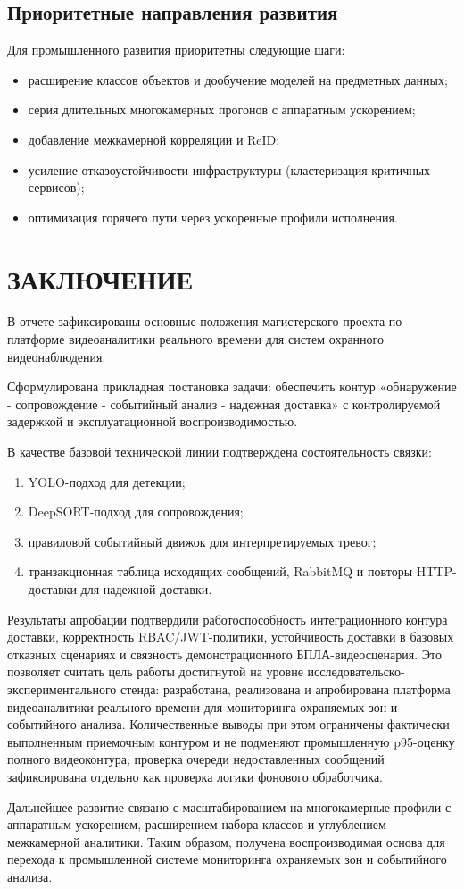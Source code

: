 \section{Приоритетные направления развития}

Для промышленного развития приоритетны следующие шаги:
\begin{itemize}
    \item расширение классов объектов и дообучение моделей на предметных данных;
    \item серия длительных многокамерных прогонов с аппаратным ускорением;
    \item добавление межкамерной корреляции и ReID;
    \item усиление отказоустойчивости инфраструктуры (кластеризация критичных сервисов);
    \item оптимизация горячего пути через ускоренные профили исполнения.
\end{itemize}

\chapter*{ЗАКЛЮЧЕНИЕ}

В отчете зафиксированы основные положения магистерского проекта по платформе видеоаналитики реального времени для систем охранного видеонаблюдения.

Сформулирована прикладная постановка задачи: обеспечить контур «обнаружение - сопровождение - событийный анализ - надежная доставка» с контролируемой задержкой и эксплуатационной воспроизводимостью.

В качестве базовой технической линии подтверждена состоятельность связки:
\begin{enumerate}
    \item YOLO-подход для детекции;
    \item DeepSORT-подход для сопровождения;
    \item правиловой событийный движок для интерпретируемых тревог;
    \item транзакционная таблица исходящих сообщений, RabbitMQ и повторы HTTP-доставки для надежной доставки.
\end{enumerate}

Результаты апробации подтвердили работоспособность интеграционного контура доставки, корректность RBAC/JWT-политики, устойчивость доставки в базовых отказных сценариях и связность демонстрационного БПЛА-видеосценария. Это позволяет считать цель работы достигнутой на уровне исследовательско-экспериментального стенда: разработана, реализована и апробирована платформа видеоаналитики реального времени для мониторинга охраняемых зон и событийного анализа. Количественные выводы при этом ограничены фактически выполненным приемочным контуром и не подменяют промышленную p95-оценку полного видеоконтура; проверка очереди недоставленных сообщений зафиксирована отдельно как проверка логики фонового обработчика.

Дальнейшее развитие связано с масштабированием на многокамерные профили с аппаратным ускорением, расширением набора классов и углублением межкамерной аналитики. Таким образом, получена воспроизводимая основа для перехода к промышленной системе мониторинга охраняемых зон и событийного анализа.
